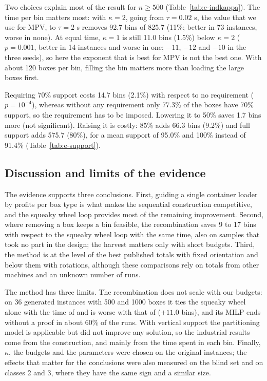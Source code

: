 Two choices explain most of the result for $n\ge 500$ (Table~\ref{tab:e-indkappa}). The time per bin matters most: with
$\kappa=2$, going from $\tau=0.02$ s, the value that we use for MPV, to $\tau=2$ s removes 92.7 bins of 825.7 (11\%;
better in 73 instances, worse in none). At equal time, $\kappa=1$ is still 11.0 bins (1.5\%) below $\kappa=2$ ($p=0.001$,
better in 14 instances and worse in one; $-11$, $-12$ and $-10$ in the three seeds), so here the exponent that is best
for MPV is not the best one. With about 120 boxes per bin, filling the bin matters more than loading the large boxes first.

Requiring 70\% support costs 14.7 bins (2.1\%) with respect to no requirement ($p=10^{-4}$), whereas without any
requirement only 77.3\% of the boxes have 70\% support, so the requirement has to be imposed. Lowering it to 50\% saves
1.7 bins more (not significant). Raising it is costly: 85\% adds 66.3 bins (9.2\%) and full support adds 575.7 (80\%),
for a mean support of 95.0\% and 100\% instead of 91.4\% (Table~\ref{tab:e-support}).

\subsection{Discussion and limits of the evidence}
\label{sec:e-discussion}
\label{sec:e-scale}

The evidence supports three conclusions. First, guiding a single container loader by profits per box type is what makes
the sequential construction competitive, and the squeaky wheel loop provides most of the remaining improvement. Second,
where removing a box keeps a bin feasible, the recombination saves 9 to 17 bins with respect to the squeaky wheel loop
with the same time, also on samples that took no part in the design; the harvest matters only with short budgets. Third,
the method is at the level of the best published totals with fixed orientation and below them with rotations, although
these comparisons rely on totals from other machines and an unknown number of runs.

The method has three limits. The recombination does not scale with our budgets: on 36 generated instances with 500 and
1000 boxes it ties the squeaky wheel alone with the time of \cfgbal{} and is worse with that of \cfgfast{} ($+11.0$
bins), and its MILP ends without a proof in about 60\% of the runs. With vertical support the partitioning model is
applicable but did not improve any solution, so the industrial results come from the construction, and mainly from
the time spent in each bin. Finally, $\kappa$, the budgets and the parameters were chosen on the original instances;
the effects that matter for the conclusions were also measured on the blind set and on classes 2 and 3, where they have
the same sign and a similar size.
